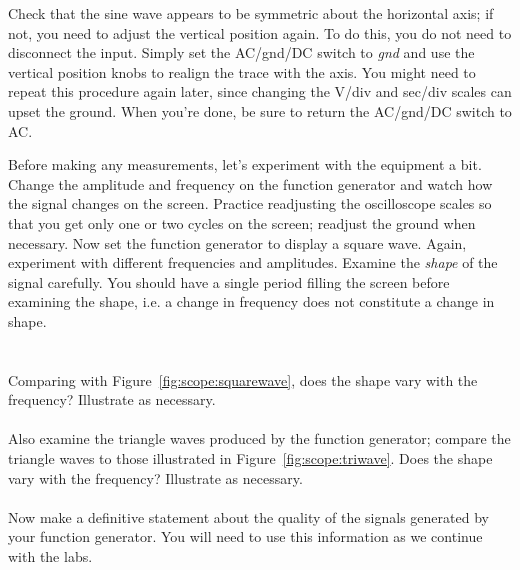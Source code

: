 \noindent Check that the sine wave appears to be symmetric about the
horizontal axis; if
not, you need to adjust the vertical position again.  To do this, you do not need to 
disconnect the input. Simply set the AC/gnd/DC switch to {\it gnd} and use the
vertical position knobs to realign the trace with the axis.  You might need
to repeat this procedure again later, since changing the V/div and sec/div
scales can upset the ground. When you're done, be sure to return the AC/gnd/DC 
switch to AC.

\noindent Before making any measurements, let's experiment with the equipment a bit.
Change the amplitude and frequency on the function generator and watch how
the signal changes on the screen. Practice readjusting the oscilloscope scales
so that you get only one or two cycles on the screen; readjust the ground when 
necessary.  Now set the function generator to display a square wave.  Again,
experiment with different frequencies and amplitudes. Examine the {\it shape}
of the signal carefully.  You should have a single period filling the screen
before examining the shape, i.e. a change in frequency does not constitute a 
change in shape. \\

  \\
\ \\
 \hspace*{0.5cm} Comparing with 
Figure~\ref{fig:scope:squarewave}, does the shape vary with the frequency?
Illustrate as necessary. \\
\vspace*{2cm} \\  
 \hspace*{0.5cm}Also examine the triangle waves produced by the
function generator; compare the triangle waves to those illustrated in
Figure~\ref{fig:scope:triwave}.  Does the shape vary with the frequency?
Illustrate as necessary. \\
\vspace*{2cm} \\   
 \hspace*{0.5cm}  Now make a definitive statement
about the quality of the signals generated by your function generator.  You
will need to use this information as we continue with the labs. \\  

